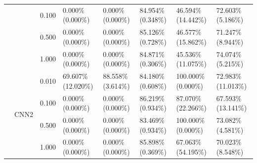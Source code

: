 \documentclass[conference,compsoc]{IEEEtran}
\begin{document}
\begin{landscape}
\begin{table}[H]
\begin{tabular}{llllllll}
& & 0.100 & 0.000\% (0.000\%) & 0.000\% (0.000\%) & 84.954\% (0.348\%) & 46.594\% (14.442\%) & 72.603\% (5.186\%) \\
& & 0.500 & 0.000\% (0.000\%) & 0.000\% (0.000\%) & 85.126\% (0.728\%) & 46.577\% (15.862\%) & 71.247\% (8.944\%) \\
& & 1.000 & 0.000\% (0.000\%) & 0.000\% (0.000\%) & 84.871\% (0.306\%) & 45.536\% (11.075\%) & 74.074\% (5.215\%) \\
\cline{2-8}
& \multirow{4}{*}{CNN2} & 0.010 & 69.607\% (12.020\%) & 88.558\% (3.614\%) & 84.180\% (0.608\%) & 100.000\% (0.000\%) & 72.983\% (11.013\%) \\
& & 0.100 & 0.000\% (0.000\%) & 0.000\% (0.000\%) & 86.219\% (0.934\%) & 87.070\% (22.266\%) & 67.593\% (13.141\%) \\
& & 0.500 & 0.000\% (0.000\%) & 0.000\% (0.000\%) & 83.469\% (0.934\%) & 100.000\% (0.000\%) & 73.082\% (4.581\%) \\
& & 1.000 & 0.000\% (0.000\%) & 0.000\% (0.000\%) & 85.898\% (0.369\%) & 67.063\% (54.195\%) & 70.023\% (8.548\%) \\
\hline
\end{tabular}
\end{table}



\end{landscape}
\end{document}
